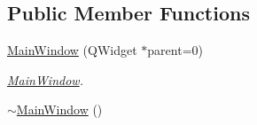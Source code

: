 \subsection*{Public Member Functions}
\begin{DoxyCompactItemize}
\item 
\hyperlink{classMainWindow_a8b244be8b7b7db1b08de2a2acb9409db}{Main\-Window} (Q\-Widget $\ast$parent=0)
\begin{DoxyCompactList}\small\item\em \hyperlink{classMainWindow}{Main\-Window}. \end{DoxyCompactList}\item 
\hypertarget{classMainWindow_ae98d00a93bc118200eeef9f9bba1dba7}{\hyperlink{classMainWindow_ae98d00a93bc118200eeef9f9bba1dba7}{$\sim$\-Main\-Window} ()}\label{classMainWindow_ae98d00a93bc118200eeef9f9bba1dba7}


\end{DoxyCompactItemize}
